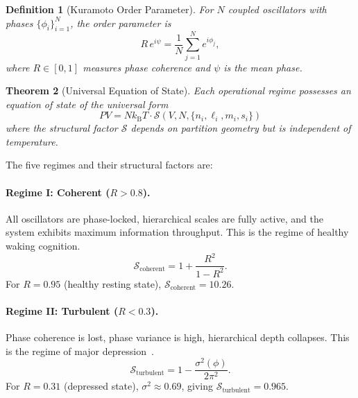 \documentclass[twocolumn,10pt]{article}
\newtheorem{theorem}{Theorem}[section]
\newtheorem{definition}[theorem]{Definition}
\theoremstyle{remark}
\newcommand{\kB}{k_{\mathrm{B}}}
\newcommand{\Rorder}{R}
\begin{document}
\begin{definition}[Kuramoto Order Parameter]
\label{def:kuramoto}
For $N$ coupled oscillators with phases $\{\phi_i\}_{i=1}^N$, the order parameter is
\begin{equation}
  \Rorder \, e^{i\psi} = \frac{1}{N} \sum_{j=1}^{N} e^{i\phi_j},
\end{equation}
where $\Rorder \in [0, 1]$ measures phase coherence and $\psi$ is the mean phase.
\end{definition}

\begin{theorem}[Universal Equation of State]
\label{thm:eos}
Each operational regime possesses an equation of state of the universal form
\begin{equation}
  \boxed{PV = N\kB T \cdot \mathcal{S}(V, N, \{n_i, \ell_i, m_i, s_i\})}
  \label{eq:eos}
\end{equation}
where the structural factor $\mathcal{S}$ depends on partition geometry but is independent of temperature.
\end{theorem}

The five regimes and their structural factors are:

\paragraph{Regime I: Coherent ($\Rorder > 0.8$).}
All oscillators are phase-locked, hierarchical scales are fully active, and the system exhibits maximum information throughput. This is the regime of healthy waking cognition.
\begin{equation}
  \mathcal{S}_{\mathrm{coherent}} = 1 + \frac{\Rorder^2}{1 - \Rorder^2}.
\end{equation}
For $\Rorder = 0.95$ (healthy resting state), $\mathcal{S}_{\mathrm{coherent}} = 10.26$.

\paragraph{Regime II: Turbulent ($\Rorder < 0.3$).}
Phase coherence is lost, phase variance is high, hierarchical depth collapses. This is the regime of major depression~\citep{fingelkurts2006impaired,leuchter2012resting}.
\begin{equation}
  \mathcal{S}_{\mathrm{turbulent}} = 1 - \frac{\sigma^2(\phi)}{2\pi^2}.
\end{equation}
For $\Rorder = 0.31$ (depressed state), $\sigma^2 \approx 0.69$, giving $\mathcal{S}_{\mathrm{turbulent}} = 0.965$.
\end{document}
